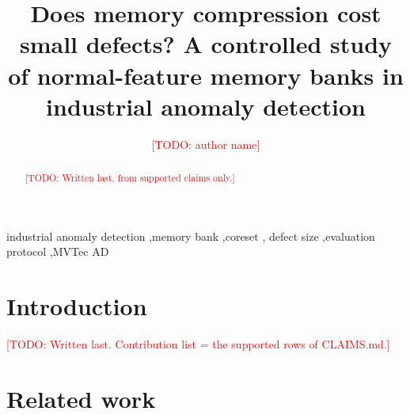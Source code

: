 \documentclass[preprint,review,12pt]{elsarticle}
\newcommand{\todo}[1]{\textcolor{red}{[TODO: #1]}}
\begin{document}
\begin{frontmatter}

\title{Does memory compression cost small defects? A controlled study of
normal-feature memory banks in industrial anomaly detection}

\author{\todo{author name}}
\address{\todo{affiliation}}

\begin{abstract}
\todo{Written last, from supported claims only.}
\end{abstract}

\begin{keyword}
industrial anomaly detection \sep memory bank \sep coreset \sep
defect size \sep evaluation protocol \sep MVTec AD
\end{keyword}

\end{frontmatter}

\section{Introduction}\label{sec:intro}
\todo{Written last. Contribution list = the supported rows of CLAIMS.md.}

\section{Related work}\label{sec:related}
\end{document}
